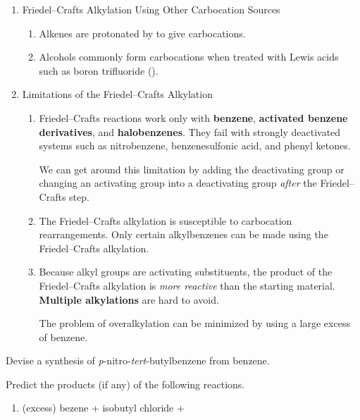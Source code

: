 \begin{enumerate}[resume]
    \item Friedel–Crafts Alkylation Using Other Carbocation Sources
    \begin{enumerate}
        \item Alkenes are protonated by  to give carbocations.
        \item Alcohols commonly form carbocations when treated with Lewis acids such as boron trifluoride ().
    \end{enumerate}
    \item Limitations of the Friedel–Crafts Alkylation
    \begin{enumerate}
        \item Friedel–Crafts reactions work only with \textbf{benzene}, \textbf{activated benzene derivatives}, and \textbf{halobenzenes}. They fail with strongly deactivated systems such as nitrobenzene, benzenesulfonic acid, and phenyl ketones.
        
        We can get around this limitation by adding the deactivating group or changing an activating group into a deactivating group \textit{after} the Friedel–Crafts step.

        \item The Friedel–Crafts alkylation is susceptible to carbocation rearrangements. Only certain alkylbenzenes can be made using the Friedel–Crafts alkylation.

        \item Because alkyl groups are activating substituents, the product of the Friedel–Crafts alkylation is \textit{more reactive} than the starting material. \textbf{Multiple alkylations} are hard to avoid.
        
        The problem of overalkylation can be minimized by using a large excess of benzene.
    \end{enumerate}
\end{enumerate}

\begin{example} %
    Devise a synthesis of \textit{p}-nitro-\textit{tert}-butylbenzene from benzene.
\end{example}

\begin{example} %
    Predict the products (if any) of the following reactions.
    \begin{enumerate}[label=(\alph*)]
        \item (excess) bezene + isobutyl chloride + 
    \end{enumerate}
\end{example}

